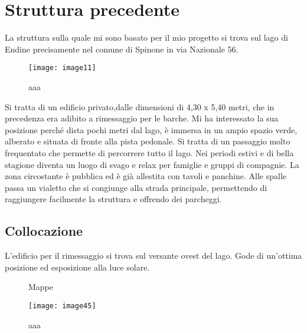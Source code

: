 \section{Struttura precedente}

La struttura sulla quale mi sono basato per il mio progetto si trova sul lago di Endine  precisamente nel comune di Spinone in via Nazionale 56. 

\begin{figure}[H]
	\centering
	\texttt{[image: image11]}
	\caption{aaa}
	\label{fig:mesh1}
\end{figure}



Si tratta di  un edificio privato,dalle dimensioni di 4,30 x 5,40 metri, che in precedenza era adibito a rimessaggio per le barche.
Mi ha interessato la sua posizione perché dista pochi metri dal lago, è immersa in un ampio spazio verde, alberato  e situata di fronte alla pista pedonale.
Si tratta di un passaggio molto frequentato  che permette di percorrere tutto il lago. 
Nei periodi estivi e di bella stagione diventa un luogo di svago e relax per famiglie e gruppi di compagnie.
La zona circostante è pubblica ed è già allestita con tavoli e panchine.
Alle spalle passa un vialetto  che si congiunge alla strada principale, permettendo di raggiungere facilmente la struttura e offrendo dei parcheggi.

\subsection{Collocazione}

L’edificio per il rimessaggio si trova sul versante ovest del lago. Gode di un'ottima posizione ed esposizione alla luce solare.

\begin{figure}[H]
	\captionsetup[subfloat]{farskip=2pt,captionskip=8pt}
	\centering
	\hspace{1cm}
	
	\caption{Mappe}
	\label{fig:imagesizes}
\end{figure}


\begin{figure}[H]
	\centering
	\texttt{[image: image45]}
	\caption{aaa}
	\label{fig:mesh1}
\end{figure}